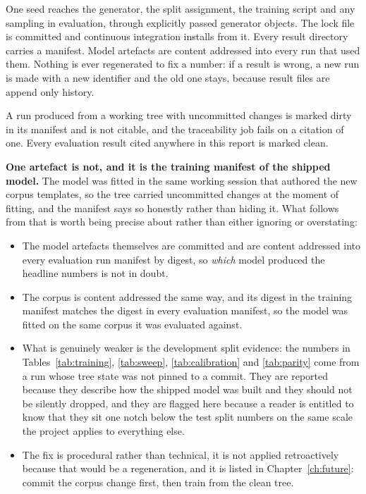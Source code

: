 One seed reaches the generator, the split assignment, the training script and
any sampling in evaluation, through explicitly passed generator objects. The lock
file is committed and continuous integration installs from it. Every result
directory carries a manifest. Model artefacts are content addressed into every
run that used them. Nothing is ever regenerated to fix a number: if a result is
wrong, a new run is made with a new identifier and the old one stays, because
result files are append only history.

A run produced from a working tree with uncommitted changes is marked dirty in
its manifest and is not citable, and the traceability job fails on a citation of
one. Every evaluation result cited anywhere in this report is marked clean.

\textbf{One artefact is not, and it is the training manifest of the shipped
model.} The model was fitted in the same working session that authored the new
corpus templates, so the tree carried uncommitted changes at the moment of
fitting, and the manifest says so honestly rather than hiding it. What follows
from that is worth being precise about rather than either ignoring or
overstating:

\begin{itemize}
  \item The model artefacts themselves are committed and are content addressed
    into every evaluation run manifest by digest, so \emph{which} model produced
    the headline numbers is not in doubt.
  \item The corpus is content addressed the same way, and its digest in the
    training manifest matches the digest in every evaluation manifest, so the
    model was fitted on the same corpus it was evaluated against.
  \item What is genuinely weaker is the development split evidence: the numbers
    in Tables~\ref{tab:training}, \ref{tab:sweep}, \ref{tab:calibration} and
    \ref{tab:parity} come from a run whose tree state was not pinned to a
    commit. They are reported because they describe how the shipped model was
    built and they should not be silently dropped, and they are flagged here
    because a reader is entitled to know that they sit one notch below the test
    split numbers on the same scale the project applies to everything else.
  \item The fix is procedural rather than technical, it is not applied
    retroactively because that would be a regeneration, and it is listed in
    Chapter~\ref{ch:future}: commit the corpus change first, then train from the
    clean tree.
\end{itemize}
